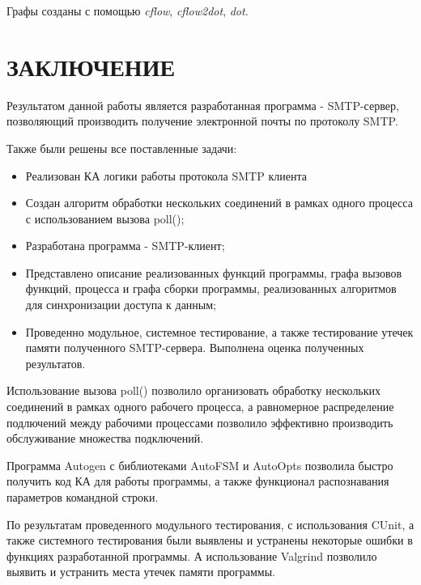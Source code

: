 \documentclass[a4paper,12pt]{report}
\begin{document}
Графы созданы с помощью \textit{cflow}, \textit{cflow2dot}, \textit{dot}.

\newpage
\section{ЗАКЛЮЧЕНИЕ}
Результатом данной работы является разработанная программа - SMTP-сервер, позволяющий производить получение электронной почты по протоколу SMTP. 

Также были решены все поставленные задачи: 

\begin{itemize}
		\item Реализован КА логики работы протокола SMTP клиента
		\item Создан алгоритм обработки нескольких соединений в рамках одного процесса с использованием вызова poll();
		\item Разработана программа - SMTP-клиент;
		\item Представлено описание реализованных функций программы, графа вызовов функций, процесса и графа сборки программы, реализованных алгоритмов для синхронизации доступа к данным;
		\item Проведенно модульное, системное тестирование, а также тестирование утечек памяти полученного SMTP-сервера. Выполнена оценка полученных результатов.

\end{itemize}

Использование вызова poll() позволило организовать обработку нескольких соединений в рамках одного рабочего процесса, а равномерное распределение подлючений между рабочими процессами позволило эффективно производить обслуживание множества подключений.

Программа Autogen с библиотеками AutoFSM и AutoOpts позволила быстро получить код КА для работы программы, а также функционал распознавания параметров командной строки.

По результатам проведенного модульного тестирования, с использования CUnit, а также системного тестирования были выявлены и устранены некоторые ошибки в функциях разработанной программы. А использование Valgrind позволило выявить и устранить места утечек памяти программы.
\end{document}
